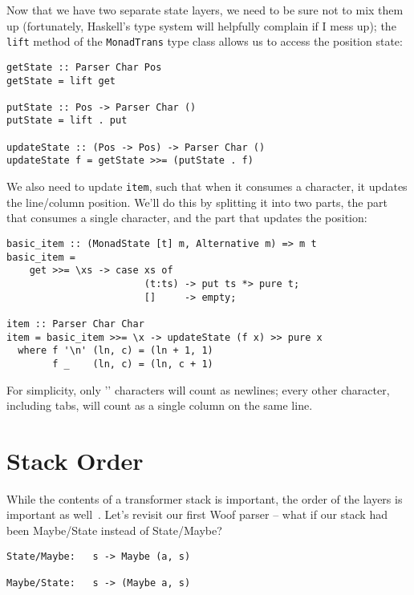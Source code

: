 \documentclass{tmr}
\begin{document}
Now that we have two separate state layers, we need to be sure not to mix them 
up (fortunately, Haskell's type system will helpfully complain if I mess up);
the \verb+lift+ method of the \verb+MonadTrans+ type class allows us to access
the position state:
\begin{verbatim}
getState :: Parser Char Pos
getState = lift get

putState :: Pos -> Parser Char ()
putState = lift . put

updateState :: (Pos -> Pos) -> Parser Char ()
updateState f = getState >>= (putState . f)
\end{verbatim}

We also need to update \verb+item+, such that when it consumes a character, 
it updates the line/column position.  We'll do this by splitting it into two
parts, the part that consumes a single character, and the part that updates the
position:
\begin{verbatim}
basic_item :: (MonadState [t] m, Alternative m) => m t
basic_item =
    get >>= \xs -> case xs of
                        (t:ts) -> put ts *> pure t;
                        []     -> empty;

item :: Parser Char Char
item = basic_item >>= \x -> updateState (f x) >> pure x
  where f '\n' (ln, c) = (ln + 1, 1)
        f _    (ln, c) = (ln, c + 1)
\end{verbatim}

For simplicity, only '\n' characters will count as newlines; every other character,
including tabs, will count as a single column on the same line.

\subsection{}





\section{Stack Order}
While the contents of a transformer stack is important, the order of the
layers is important as well~\cite{stack}.  Let's revisit our first Woof parser -- what if our 
stack had been Maybe/State instead of State/Maybe?
\begin{verbatim}
State/Maybe:   s -> Maybe (a, s)

Maybe/State:   s -> (Maybe a, s)
\end{verbatim}
\end{document}
